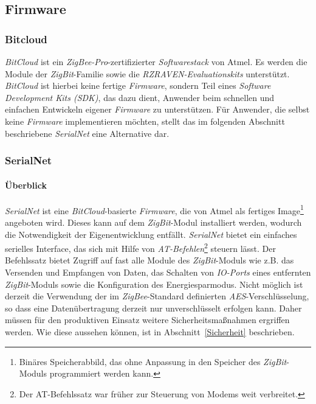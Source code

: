     \subsection{Firmware}
        \subsubsection{Bitcloud}
            \emph{BitCloud}  ist ein \emph{ZigBee-Pro}-zertifizierter \emph{Softwarestack} von Atmel. Es werden die 
            Module der \emph{ZigBit}-Familie
            sowie die \emph{RZRAVEN-Evaluationskits} unterstützt. \emph{BitCloud} ist hierbei keine fertige
            \emph{Firmware}, sondern 
            Teil eines \emph{Software Development Kits (SDK)}, das dazu dient, Anwender beim schnellen und einfachen Entwickeln eigener 
            \emph{Firmware} zu unterstützen. Für Anwender, die selbst keine \emph{Firmware} implementieren möchten, 
            stellt das im folgenden Abschnitt beschriebene \emph{SerialNet} eine Alternative dar.

        \subsubsection{SerialNet}

            \paragraph{Überblick}
                \emph{SerialNet} ist eine \emph{BitCloud}-basierte \emph{Firmware}, die von Atmel als fertiges Image\footnote{Binäres Speicherabbild,
                    das ohne Anpassung in den Speicher des \emph{ZigBit}-Moduls programmiert werden kann.} angeboten
                wird. Dieses kann auf dem \emph{ZigBit}-Modul installiert werden, wodurch die Notwendigkeit der 
                Eigenentwicklung entfällt. \emph{SerialNet} bietet ein einfaches serielles Interface, das sich mit
                Hilfe von \emph{AT-Befehlen}\footnote{Der AT-Befehlssatz war früher zur Steuerung von Modems weit 
                verbreitet.} 
                steuern lässt. Der Befehlssatz bietet Zugriff auf fast alle Module des \emph{ZigBit}-Moduls wie z.B. das
                Versenden und Empfangen von Daten, das Schalten von \emph{IO-Ports} eines entfernten 
                \emph{ZigBit}-Moduls sowie die
                Konfiguration des Energiesparmodus. Nicht möglich ist derzeit die Verwendung der im \emph{ZigBee}-Standard
                definierten \emph{AES}-Verschlüsselung, so dass eine Datenübertragung derzeit nur 
                unverschlüsselt erfolgen kann.
                Daher müssen für den produktiven Einsatz weitere Sicherheitsmaßnahmen ergriffen werden. Wie diese aussehen 
                können, ist in Abschnitt~\ref{Sicherheit} beschrieben. 

